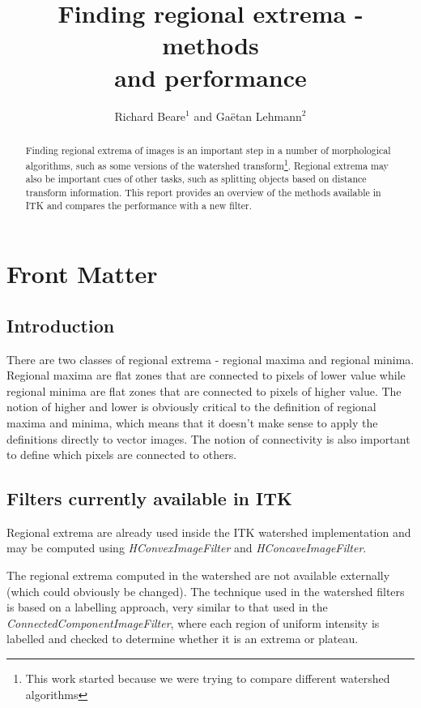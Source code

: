 \documentclass{InsightArticle}
\title{Finding regional extrema - methods\\ and performance}
\author{Richard Beare{$^1$} {\small{and}} Ga\"etan Lehmann{$^2$}}
\begin{document}
\maketitle

\ifhtml
\chapter*{Front Matter\label{front}}
\fi

\begin{abstract}
\noindent
Finding regional extrema of images is an important step in a number of
morphological algorithms, such as some versions of the watershed
transform\footnote{This work started because we were trying to compare
different watershed algorithms}. Regional extrema may also be
important cues of other tasks, such as splitting objects based on
distance transform information. This report provides an overview of
the methods available in ITK and compares the performance with a new
filter.

\end{abstract}


\section{Introduction}
There are two classes of regional extrema - regional maxima and
regional minima. Regional maxima are flat zones that are connected to
pixels of lower value while regional minima are flat zones that are
connected to pixels of higher value. The notion of higher and lower is
obviously critical to the definition of regional maxima and minima,
which means that it doesn't make sense to apply the definitions
directly to vector images. The notion of connectivity is also important
to define which pixels are connected to others.

\section{Filters currently available in ITK}
Regional extrema are already used inside the ITK watershed
implementation and may be computed using {\em HConvexImageFilter}
and {\em HConcaveImageFilter}. 

The regional extrema computed in the watershed are not available
externally (which could obviously be changed). The technique used in
the watershed filters is based on a labelling approach, very similar
to that used in the {\em ConnectedComponentImageFilter}, where each
region of uniform intensity is labelled and checked to determine
whether it is an extrema or plateau.
\end{document}
